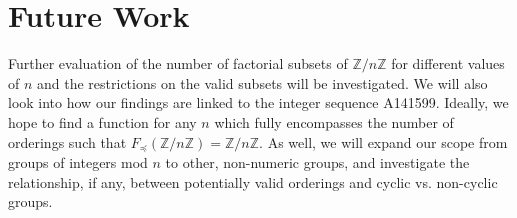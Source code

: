 \documentclass{article}
\newcommand{\ZZ}{\mathbb{Z}}
\newcommand{\ZnZ}{\ZZ/n\ZZ}
\newcommand{\FZ}{F_{\preceq}\left(\ZZ/n\ZZ\right)}
\begin{document}
\section{Future Work}
Further evaluation of the number of factorial subsets of $\ZnZ$ for different values of $n$ and the restrictions on the valid subsets will be investigated. We will also look into how our findings are linked to the integer sequence A141599. Ideally, we hope to find a function for any $n$ which fully encompasses the number of orderings such that $\FZ = \ZnZ$. As well, we will expand our scope from groups of integers mod $n$ to other, non-numeric groups, and investigate the relationship, if any, between potentially valid orderings and cyclic vs. non-cyclic groups.
\end{document}
